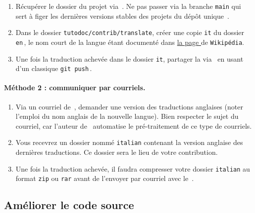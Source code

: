\begin{enumerate}
    \item Récupérer le dossier du projet via \thisrepo\,.
    Ne pas passer via la branche \verb#main# qui sert à figer les dernières versions stables des projets du dépôt unique \thismonorepo\,.

    \item Dans le dossier \verb#tutodoc/contrib/translate#, créer une copie \verb#it# du dossier \verb#en#\,, le nom court de la langue étant documenté dans
    \href{https://en.wikipedia.org/wiki/IETF_language_tag#List_of_common_primary_language_subtags}%
         {la page }
    de \texttt{Wikipédia}.

    \item Une fois la traduction achevée dans le dossier \verb#it#, partager la via \thisrepo\ en usant d'un classique \verb#git push#\,.
\end{enumerate}


\paragraph{Méthode 2 : communiquer par courriels.}

\begin{enumerate}
    \item Via un courriel de \,, demander une version des traductions anglaises (noter l'emploi du nom anglais de la nouvelle langue).
    Bien respecter le sujet du courriel, car l'auteur de \thisproj\ automatise le pré-traitement de ce type de courriels.

    \item Vous recevrez un dossier nommé \verb#italian# contenant la version anglaise des dernières traductions.
    Ce dossier sera le lieu de votre contribution.

    \item Une fois la traduction achevée, il faudra compresser votre dossier \verb#italian# au format \verb#zip# ou \verb#rar# avant de l'envoyer par courriel avec le \,.
\end{enumerate}



\subsection{Améliorer le code source}

